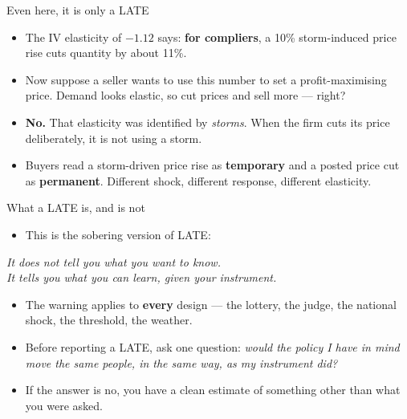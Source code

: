 \documentclass[
  11pt,
  ignorenonframetext,
  aspectratio=169,
]{beamer}
\providecommand{\tightlist}{%
  \setlength{\itemsep}{0pt}\setlength{\parskip}{0pt}}
\begin{document}
\begin{frame}{Even here, it is only a LATE}
\protect{}\label{even-here-it-is-only-a-late}
\begin{itemize}
\tightlist
\item
  The IV elasticity of \(-1.12\) says: \textbf{for compliers}, a 10\%
  storm-induced price rise cuts quantity by about 11\%.
\item
  Now suppose a seller wants to use this number to set a
  profit-maximising price. Demand looks elastic, so cut prices and sell
  more --- right?
\item
  \textbf{No.} That elasticity was identified by \emph{storms}. When the
  firm cuts its price deliberately, it is not using a storm.
\item
  Buyers read a storm-driven price rise as \textbf{temporary} and a
  posted price cut as \textbf{permanent}. Different shock, different
  response, different elasticity.
\end{itemize}
\end{frame}

\begin{frame}{What a LATE is, and is not}
\protect{}\label{what-a-late-is-and-is-not}
\begin{itemize}
\tightlist
\item
  This is the sobering version of LATE:
\end{itemize}

\vspace{0.2em}

\begin{center}
\emph{It does not tell you what you want to know.}\\
\emph{It tells you what you can learn, given your instrument.}
\end{center}

\vspace{0.4em}

\begin{itemize}
\tightlist
\item
  The warning applies to \textbf{every} design --- the lottery, the
  judge, the national shock, the threshold, the weather.
\item
  Before reporting a LATE, ask one question: \emph{would the policy I
  have in mind move the same people, in the same way, as my instrument
  did?}
\item
  If the answer is no, you have a clean estimate of something other than
  what you were asked.
\end{itemize}
\end{frame}
\end{document}
